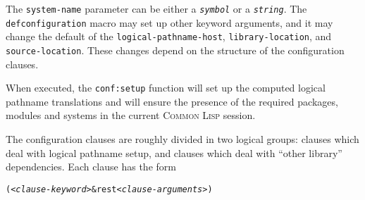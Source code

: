 \documentclass{article}
\newcommand{\CL}{\textsc{Common Lisp}}
\newcommand{\defconfiguration}{\texttt{defconfiguration}}
\newcommand{\code}[1]{\texttt{#1}}
\newcommand{\clobject}[1]{\texttt{\textit{#1}}} %
\begin{document}
\noindent
The \code{system-name} parameter can be either a \clobject{symbol} or
a \clobject{string}.  The \defconfiguration{} macro may set up other
keyword arguments, and it may change the default of the
\code{logical-pathname-host}, \code{library-location}, and
\code{source-location}.  These changes depend on the structure of the
configuration clauses.

When executed, the \code{conf:setup} function will set up the computed
logical pathname translations and will ensure the presence of the
required packages, modules and systems in the current \CL{} session.

The configuration clauses are roughly divided in two logical groups:
clauses which deal with logical pathname setup, and clauses which deal
with ``other library'' dependencies.  Each clause has the form

\begin{alltt}
(\emph{<clause-keyword>} &rest \emph{<clause-arguments>})
\end{alltt}
\end{document}
